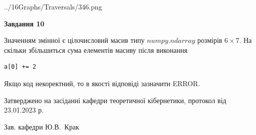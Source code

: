 \documentclass[12pt, ukrainian]{article}
\begin{document}
{\begin {large}
\begin{center}
	{../16Graphs/Traversals/346.png}
\end{center}\par
\newpage

{\begin {center}\textbf{Завдання 10}\end {center}}\par
Значенням змінної  є цілочисловий масив типу $numpy.ndarray$ розмірів $6{\times}7$. На скільки збільшиться сума елементів масиву  після виконання
\begin{verbatim}
a[0] += 2
\end{verbatim}


Якщо код некоректний, то в якості відповіді зазначити ERROR.\par
\newpage


\end {large}
}
{\smallskip \begin {small} Затверджено на засіданні кафедри теоретичної кібернетики, протокол  від   23.01.2023 р.\par\smallskip\smallskip
{\parbox {6.5 cm}{Зав. кафедри \dotfill Ю.В.~Крак}} \end{small}}
\end{document}
